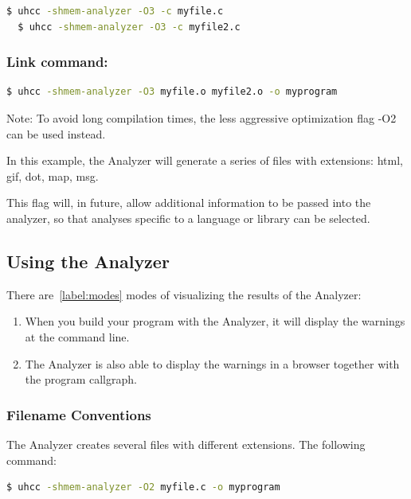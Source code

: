 \begin{lstlisting}[language=bash]
  $ uhcc -shmem-analyzer -O3 -c myfile.c
  $ uhcc -shmem-analyzer -O3 -c myfile2.c
\end{lstlisting}

\subsubsection*{Link command:}

\begin{lstlisting}[language=bash]
  $ uhcc -shmem-analyzer -O3 myfile.o myfile2.o -o myprogram 
\end{lstlisting}

Note: To avoid long compilation times, the less aggressive
optimization flag -O2 can be used instead.

In this example, the \openshmem Analyzer will generate a
series of files with extensions: html, gif, dot, map, msg.

This flag will, in future, allow additional information to be passed
into the analyzer, so that analyses specific to a language or library
can be selected.

\subsection{Using the \openshmem Analyzer}

There are~\ref{label:modes} modes of visualizing the results of the \openshmem
Analyzer:

\begin{enumerate}
\item When you build your program with the \openshmem Analyzer, it
  will display the warnings at the command line.
\item The \openshmem Analyzer is also able to display the warnings in
  a browser together with the program callgraph. \label{label:modes}
\end{enumerate}

\subsubsection{Filename Conventions}

The \openshmem Analyzer creates several files with different extensions. 
The following command:

\begin{lstlisting}[language=bash]
  $ uhcc -shmem-analyzer -O2 myfile.c -o myprogram
\end{lstlisting}

